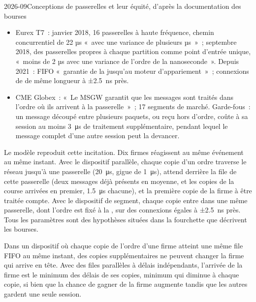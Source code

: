 \begin{dated}{2026-09}{Conceptions de passerelles et leur équité, d'après la documentation des bourses}\label{dat:nw:futures-connectivity:gateways}
\begin{itemize}
\item Eurex T7~: janvier 2018, 16 passerelles à haute fréquence, chemin concurrentiel de 22 µs «~avec une variance de plusieurs µs~»~; septembre
  2018, des passerelles propres à chaque partition comme point d'entrée unique, «~moins de 2 µs avec une variance de l'ordre de la nanoseconde~». Depuis 2021~: FIFO
  «~garantie de la  jusqu'au moteur d'appariement~»~; connexions de  de même longueur à ±2.5~ns près.
\item CME Globex~: «~Le MSGW garantit que les messages sont traités dans l'ordre où ils arrivent à la passerelle~»~; 17 segments
  de marché. Garde-fous~: un message découpé entre plusieurs paquets, ou reçu hors d'ordre, coûte à sa session au moins
  \qty{3}{\micro\second} de traitement supplémentaire, pendant lequel le message complet d'une autre session peut la devancer.
\end{itemize}
\end{dated}

Le modèle reproduit cette incitation. Dix firmes réagissent au même événement au même instant. Avec le dispositif parallèle, chaque
copie d'un ordre traverse le réseau jusqu'à une passerelle (\qty{20}{\micro\second}, gigue de \qty{1}{\micro\second}), attend derrière la file de cette passerelle
(deux messages déjà présents en moyenne, et les copies de la course arrivées en premier,
\qty{1.5}{\micro\second} chacune), et la première copie de la firme à être traitée compte. Avec le dispositif de segment, chaque copie entre dans une
même passerelle, dont l'ordre est fixé à la , sur des connexions égales à ±2.5~ns près. Tous les paramètres sont des hypothèses situées dans la
fourchette que décrivent les bourses.

\label{lst:nw:futures-connectivity:race}

\begin{proposition}\label{prop:nw:futures-connectivity:copies}
Dans un dispositif où chaque copie de l'ordre d'une firme atteint une même file FIFO au même instant, des copies supplémentaires ne peuvent
changer la firme qui arrive en tête. Avec des files parallèles à délais indépendants, l'arrivée de la firme est le minimum des délais de ses copies,
minimum qui diminue à chaque copie, si bien que la chance de gagner de la firme augmente tandis que les autres gardent une seule session.
\end{proposition}

